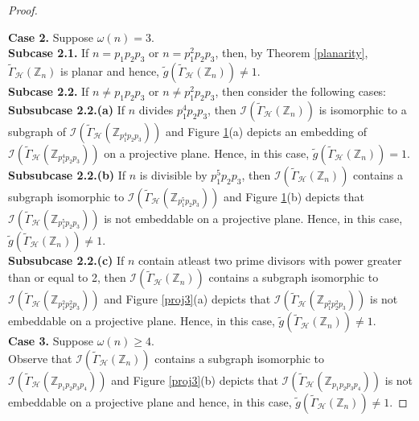 \documentclass[11pt,a4paper]{article}
\theoremstyle{definition}
\theoremstyle{remark}
\begin{document}
\begin{proof}
\begin{figure}[htbp!]
{}
			\caption{}
			\label{proj2}
			\end{figure}
			\noindent\textbf{Case 2.} Suppose $\omega(n)  = 3$.\\
		\textbf{Subcase 2.1.} If $n=p_1p_2p_3$ or $n=p_1^2p_2p_3$, then, by Theorem \ref{planarity}, $\tilde{\Gamma}_\mathcal{H}(\mathbb{Z}_n)$ is planar and hence, $\tilde{g}(\tilde{\Gamma}_\mathcal{H}(\mathbb{Z}_n)) \neq 1$.\\
			\textbf{Subcase 2.2.}  If $n \neq p_1p_2p_3$ or $n \neq p_1^2p_2p_3$, then consider the following cases:\\
			\textbf{Subsubcase 2.2.(a)} If $n$ divides $p_1^4p_2p_3$, then  $\mathcal{I}(\tilde{\Gamma}_\mathcal{H}(\mathbb{Z}_n))$ is isomorphic to a subgraph of $\mathcal{I}(\tilde{\Gamma}_\mathcal{H}(\mathbb{Z}_{p_1^4p_2p_3}))$ and   Figure \ref{proj2}(a) depicts an embedding of $\mathcal{I}(\tilde{\Gamma}_\mathcal{H}(\mathbb{Z}_{p_1^4p_2p_3}))$ on a projective plane. Hence, in this case,  $\tilde{g}(\tilde{\Gamma}_\mathcal{H}(\mathbb{Z}_n)) = 1$. \\
			\textbf{Subsubcase 2.2.(b)} If $n$ is divisible by $p_1^5p_2p_3$, then $\mathcal{I}(\tilde{\Gamma}_\mathcal{H}(\mathbb{Z}_n))$ contains a subgraph isomorphic to $\mathcal{I}(\tilde{\Gamma}_\mathcal{H}(\mathbb{Z}_{p_1^5p_2p_3}))$ and Figure \ref{proj2}(b) depicts that $\mathcal{I}(\tilde{\Gamma}_\mathcal{H}(\mathbb{Z}_{p_1^5p_2p_3}))$ is not embeddable on a projective plane. Hence, in this case,  $\tilde{g}(\tilde{\Gamma}_\mathcal{H}(\mathbb{Z}_n)) \neq 1$.
			\\ 
			\textbf{Subsubcase 2.2.(c)} If $n$ contain atleast two prime divisors with power greater than  or equal to 2, then  $\mathcal{I}(\tilde{\Gamma}_\mathcal{H}(\mathbb{Z}_n))$ contains a subgraph isomorphic to $\mathcal{I}(\tilde{\Gamma}_\mathcal{H}(\mathbb{Z}_{p_1^2p_2^2p_3}))$ and Figure \ref{proj3}(a) depicts that  $\mathcal{I}(\tilde{\Gamma}_\mathcal{H}(\mathbb{Z}_{p_1^2p_2^2p_3}))$  is not embeddable on a projective plane. Hence, in this case,   $\tilde{g}(\tilde{\Gamma}_\mathcal{H}(\mathbb{Z}_n)) \neq 1$.\\
			\noindent\textbf{Case 3.} Suppose $\omega(n) \geq 4$.\\
			Observe that $\mathcal{I}(\tilde{\Gamma}_\mathcal{H}(\mathbb{Z}_n))$ contains a subgraph isomorphic to $\mathcal{I}(\tilde{\Gamma}_\mathcal{H}(\mathbb{Z}_{p_1p_2p_3p_4}))$ and Figure \ref{proj3}(b) depicts that  $\mathcal{I}(\tilde{\Gamma}_\mathcal{H}(\mathbb{Z}_{p_1p_2p_3p_4}))$ is not embeddable on a projective plane  and hence, in this case,   $\tilde{g}(\tilde{\Gamma}_\mathcal{H}(\mathbb{Z}_n)) \neq 1$.

\end{proof}
\end{document}
